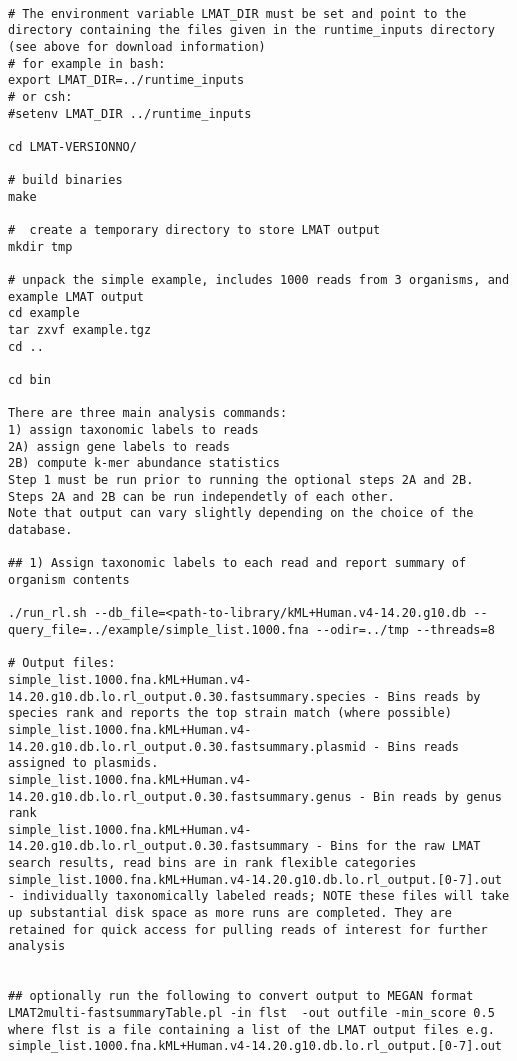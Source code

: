\documentclass[11pt]{article}
\begin{document}
\begin{verbatim}

# The environment variable LMAT_DIR must be set and point to the directory containing the files given in the runtime_inputs directory (see above for download information)
# for example in bash:
export LMAT_DIR=../runtime_inputs
# or csh:
#setenv LMAT_DIR ../runtime_inputs

cd LMAT-VERSIONNO/

# build binaries
make

#  create a temporary directory to store LMAT output
mkdir tmp

# unpack the simple example, includes 1000 reads from 3 organisms, and example LMAT output
cd example
tar zxvf example.tgz
cd ..

cd bin

There are three main analysis commands: 
1) assign taxonomic labels to reads
2A) assign gene labels to reads
2B) compute k-mer abundance statistics
Step 1 must be run prior to running the optional steps 2A and 2B. Steps 2A and 2B can be run independetly of each other.
Note that output can vary slightly depending on the choice of the database.

## 1) Assign taxonomic labels to each read and report summary of organism contents

./run_rl.sh --db_file=<path-to-library/kML+Human.v4-14.20.g10.db --query_file=../example/simple_list.1000.fna --odir=../tmp --threads=8

# Output files:
simple_list.1000.fna.kML+Human.v4-14.20.g10.db.lo.rl_output.0.30.fastsummary.species - Bins reads by species rank and reports the top strain match (where possible)
simple_list.1000.fna.kML+Human.v4-14.20.g10.db.lo.rl_output.0.30.fastsummary.plasmid - Bins reads assigned to plasmids.
simple_list.1000.fna.kML+Human.v4-14.20.g10.db.lo.rl_output.0.30.fastsummary.genus - Bin reads by genus rank
simple_list.1000.fna.kML+Human.v4-14.20.g10.db.lo.rl_output.0.30.fastsummary - Bins for the raw LMAT search results, read bins are in rank flexible categories
simple_list.1000.fna.kML+Human.v4-14.20.g10.db.lo.rl_output.[0-7].out - individually taxonomically labeled reads; NOTE these files will take up substantial disk space as more runs are completed. They are retained for quick access for pulling reads of interest for further analysis 


## optionally run the following to convert output to MEGAN format
LMAT2multi-fastsummaryTable.pl -in flst  -out outfile -min_score 0.5
where flst is a file containing a list of the LMAT output files e.g. simple_list.1000.fna.kML+Human.v4-14.20.g10.db.lo.rl_output.[0-7].out



\end{verbatim}
\end{document}
